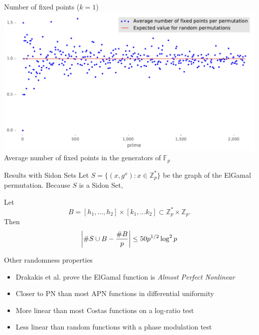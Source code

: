 \begin{frame}{Number of fixed points ($k=1$)}
        \centering
        \includegraphics[width=\textwidth]{figures/average_number_of_fixed_points_per_permutation}\\
{Average number of fixed points in the generators of $\mathbb{F}_p$}
\end{frame}


\begin{frame}{Results with Sidon Sets}
  Let $S = \{(x,g^x): x \in \mathbb{Z}_p^*\}$ be the graph of the ElGamal permutation. Because $S$ is a Sidon Set,

  \begin{theorem}[Niehues et al., 2020]
    Let
    \[
      B = [h_1,\ldots, h_2] \times [k_1,\ldots k_2] \subset \mathbb{Z}_p^* \times \mathbb{Z}_p.
    \]
    Then
    \[
      \left | \#{S \cup B} - \frac{\#{B}}{p} \right | \leq 50 p^{1/2} \log^2 p
\]
    \end{theorem}
\end{frame}

\begin{frame}{Other randomness properties}

  \begin{itemize}
  \item Drakakis et al. prove the ElGamal function is {\em Almost Perfect Nonlinear}
    \item Closer to PN than most APN functions in differential uniformity
    \item More linear than most Costas functions on a log-ratio test
      \item Less linear than random functions with a phase modulation test 
    \end{itemize}
  
  \end{frame}



